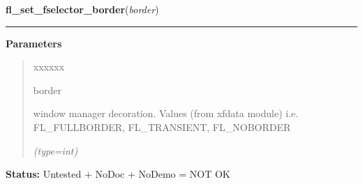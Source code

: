 \hspace{.8\funcindent}\begin{boxedminipage}{\funcwidth}

    \raggedright \textbf{fl\_set\_fselector\_border}(\textit{border})

    \vspace{-1.5ex}

    \rule{\textwidth}{0.5\fboxrule}
\setlength{\parskip}{2ex}
\setlength{\parskip}{1ex}
      \textbf{Parameters}
      \vspace{-1ex}

      \begin{quote}
        \begin{Ventry}{xxxxxx}

          \item[border]

          window manager decoration. Values (from xfdata module) i.e. 
          FL\_FULLBORDER, FL\_TRANSIENT, FL\_NOBORDER

            {\it (type=int)}

        \end{Ventry}

      \end{quote}

\textbf{Status:} Untested + NoDoc + NoDemo = NOT OK



    \end{boxedminipage}

    \label{xformslib:flgoodies:fl_set_fselector_transient}

    \vspace{0.5ex}


